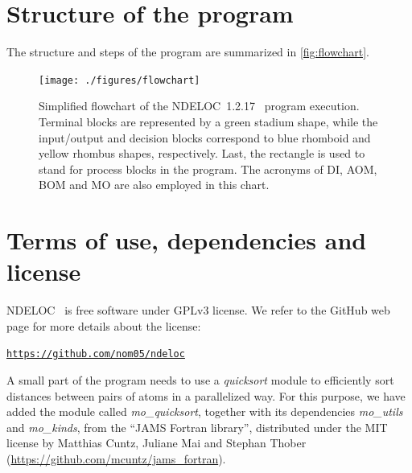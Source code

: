 \documentclass[a4paper,11pt,openany]{memoir}
\newcommand\versionprog{1.2.17}
\newcommand\programa{\textsc{NDELOC}}
\begin{document}
\section{Structure of the program}
The structure and steps of the program are summarized in \autoref{fig:flowchart}.

\begin{figure}
	\begin{center}
		\texttt{[image: ./figures/flowchart]}
		\caption{Simplified flowchart of the \programa~\versionprog~ program execution. Terminal blocks are represented by a green stadium shape, while the input/output and decision blocks correspond to blue rhomboid and yellow rhombus shapes, respectively. Last, the rectangle is used to stand for process blocks in the program. The acronyms of \acf{DI}, \acf{AOM}, \acf{BOM} and \acf{MO} are also employed in this chart.}\label{fig:flowchart}
	\end{center}
\end{figure}

\section{Terms of use, dependencies and license}
\programa~ is free software under GPLv3 license. We refer to the GitHub web page for more details about the license:
\begin{center}
	\texttt{\url{https://github.com/nom05/ndeloc}}
\end{center}

A small part of the program needs to use a \emph{quicksort} module to efficiently sort distances between pairs of atoms in a parallelized way. For this purpose, we have added the module called \emph{mo\_quicksort}, together with its dependencies \emph{mo\_utils} and \emph{mo\_kinds}, from the ``JAMS Fortran library'', distributed under the MIT license by Matthias Cuntz, Juliane Mai and Stephan Thober (\url{https://github.com/mcuntz/jams_fortran}).

\end{document}
